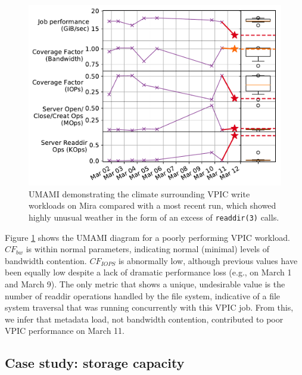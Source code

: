 {\begin{figure}[t]
    \centering
    \includegraphics[width=1.0\columnwidth]{figs/umami-mira-fs1-vpic-write.pdf}
    \vspace{-.25in}
    \caption{UMAMI demonstrating the climate surrounding VPIC write workloads on Mira compared with a most recent run, which showed highly unusual weather in the form of an excess of \texttt{readdir(3)} calls.
    }
    \label{fig:umami-mira-fs1-vpic-write}
    \vspace{-.15in}
\end{figure}

Figure \ref{fig:umami-mira-fs1-vpic-write} shows the UMAMI diagram for a poorly performing VPIC workload.
$\mathit{CF}_{\mathit{bw}}$ is within normal parameters, indicating normal (minimal) levels of bandwidth contention.
$\mathit{CF}_{\mathit{IOPS}}$ is abnormally low, although previous values have been equally low despite a lack of dramatic performance loss (e.g., on March 1 and March 9).
The only metric that shows a unique, undesirable value is the number of readdir operations handled by the file system, indicative of a file system traversal that was running concurrently with this VPIC job.   From this, we infer that metadata load, not bandwidth contention, contributed to poor VPIC performance on March 11.

\subsection{Case study: storage capacity}

}
